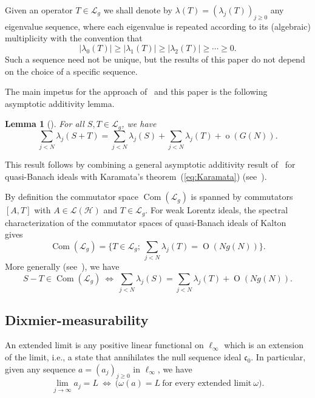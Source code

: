 \documentclass[10pt, a4paper]{amsart}
\newcommand{\sL}{\mathscr{L}}
\newcommand{\sH}{\mathscr{H}}
\newcommand{\co}{\mathfrak{c}_{0}}
\newcommand{\op}{\operatorname}
\newcommand{\Com}{\op{Com}}
\numberwithin{equation}{section}
\newtheorem{lemma}[theorem]{Lemma}
\theoremstyle{definition}
\theoremstyle{remark}
\begin{document}
Given an operator $T \in \sL_g$ we shall denote by $\lambda(T)=(\lambda_j(T))_{j\geq 0}$ any eigenvalue sequence, where each eigenvalue is repeated according to its (algebraic) multiplicity with the convention that
\begin{equation*}
 |\lambda_0(T)|\geq |\lambda_1(T)|\geq  |\lambda_2(T)|\geq \cdots \geq 0.
\end{equation*}
Such a sequence need not be unique, but the results of this paper do not depend on the choice of a specific sequence. 

The main impetus for the approach of~\cite{PT:Part1} and this paper is the following asymptotic additivity lemma. 

\begin{lemma}[\cite{LSZ:Book, PT:Part1}]  
 For all $S,T\in \sL_g$, we have
\begin{equation}\label{eq:prelim.asymptotic-additivity}
 \sum_{j<N}\lambda_j(S+T)=\sum_{j<N}\lambda_j(S)+\sum_{j<N}\lambda_j(T)+\op{o}(G(N)).
\end{equation}
\end{lemma}

This result follows by combining a general asymptotic additivity result of~\cite{LSZ:Book} for quasi-Banach ideals with Karamata's theorem~(\ref{eq:Karamata}) (see~\cite{PT:Part1}).

By definition the commutator space $\Com(\sL_g)$ is spanned by commutators $[A,T]$ with $A\in \sL(\sH)$ and $T\in \sL_g$. For weak Lorentz ideals, the spectral characterization of the commutator spaces of quasi-Banach ideals of Kalton~\cite{Ka:Crelle98} gives
\begin{equation}\label{eq:spectral1}
 \Com\left(\sL_g\right)= \bigg\{T\in \sL_g; \ \sum_{j<N} \lambda_j(T)= \op{O}(Ng(N))\bigg\}. 
\end{equation}
More generally (see~\cite{LSZ:Book}), we have
\begin{equation}\label{eq:com difference}
S-T \in \Com\left(\sL_g\right) \ \Longleftrightarrow \  \sum_{j<N} \lambda_j(S)=\sum_{j<N} \lambda_j(T)+ \op{O}(Ng(N)).
\end{equation}

\subsection{Dixmier-measurability} 
An extended limit is any positive linear functional on $\ell_\infty$ which is an extension of the limit, i.e., a state that annihilates the null sequence ideal $\co$. In particular, given any sequence $a=(a_j)_{j\geq 0}$ in $\ell_\infty$, we have
\begin{equation*}
 \lim_{j\rightarrow \infty} a_j =L \ \Longleftrightarrow \ \big(\omega(a)=L \ \text{for every extended limit}\ \omega\big). 
\end{equation*}
 
\end{document}
